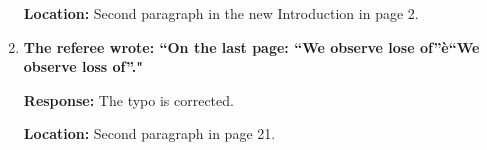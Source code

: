 \documentclass[11pt]{article}
\newcommand{\response}[1]{\textcolor{blue}{#1}}
\begin{document}
\begin{enumerate}
\noindent
{\bf Location:} Second paragraph in the new Introduction in page 2.

\item {\bf The referee wrote: ``On the last page: “We observe lose of”è“We observe loss of”."}

\noindent
{\bf Response:} The typo is corrected.

\noindent
{\bf Location:} Second paragraph in page 21.


 \end{enumerate}

%
%
%
%
\end{document}
